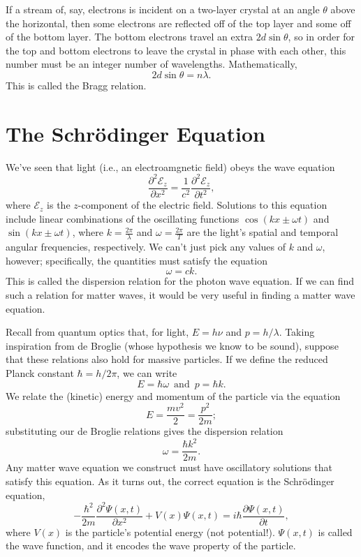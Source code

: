\documentclass[../p052main.tex]{subfiles}
\begin{document}
If a stream of, say, electrons is incident on a two-layer crystal at an angle $\theta$ above the horizontal, then some electrons are reflected off of the top layer and some off of the bottom layer.
The bottom electrons travel an extra $2d\sin\theta$, so in order for the top and bottom electrons to leave the crystal in phase with each other, this number must be an integer number of wavelengths.
Mathematically,
\[ 2d \sin\theta = n \lambda. \]
This is called the Bragg relation.

\section{The Schrödinger Equation}%
We've seen that light (i.e., an electroamgnetic field) obeys the wave equation
\[ \frac{\partial^2 \mathcal{E}_z}{\partial x^2} = \frac{1}{c^2} \frac{\partial^2 \mathcal{E}_z}{\partial t^2}, \]
where $\mathcal{E}_z$ is the $z$-component of the electric field.
Solutions to this equation include linear combinations of the oscillating functions $\cos (kx \pm \omega t)$ and $\sin (kx \pm \omega t)$, where $k = \frac{2\pi}{\lambda}$ and $\omega = \frac{2\pi}{T}$ are the light's spatial and temporal angular frequencies, respectively.
We can't just pick any values of $k$ and $\omega$, however; specifically, the quantities must satisfy the equation
\[ \omega = ck. \]
This is called the dispersion relation for the photon wave equation.
If we can find such a relation for matter waves, it would be very useful in finding a matter wave equation.

Recall from quantum optics that, for light, $E = h\nu$ and $p = h / \lambda$.
Taking inspiration from de Broglie (whose hypothesis we know to be sound), suppose that these relations also hold for massive particles.
If we define the reduced Planck constant $\hbar = h / 2\pi$, we can write
\[ E = \hbar \omega \,\text{ and }\, p = \hbar k. \]
We relate the (kinetic) energy and momentum of the particle via the equation
\[ E = \frac{mv^2}{2} = \frac{p^2}{2m}; \]
substituting our de Broglie relations gives the dispersion relation
\[ \omega = \frac{\hbar k^2}{2m}. \]
Any matter wave equation we construct must have oscillatory solutions that satisfy this equation.
As it turns out, the correct equation is the Schrödinger equation,
\[ -\frac{\hbar^2}{2m} \frac{\partial^2 \Psi(x,t)}{\partial x^2} + V(x) \Psi(x,t) = i \hbar \frac{\partial \Psi(x,t)}{\partial t}, \]
where $V(x)$ is the particle's potential energy (not potential!).
$\Psi(x,t)$ is called the wave function, and it encodes the wave property of the particle.
\end{document}
